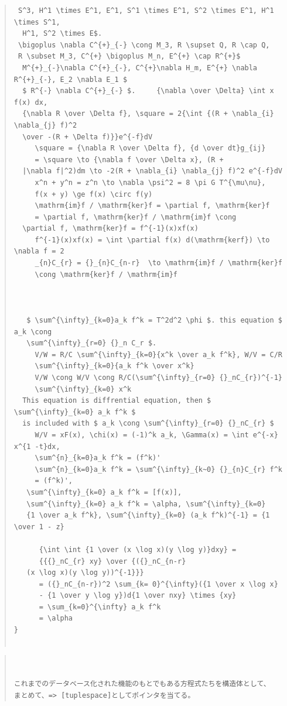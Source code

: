 \documentclass{jsarticle}
\begin{document}
\begin{quote}
\begin{verbatim}
 S^3, H^1 \times E^1, E^1, S^1 \times E^1, S^2 \times E^1, H^1 \times S^1, 
  H^1, S^2 \times E$.  
 \bigoplus \nabla C^{+}_{-} \cong M_3, R \supset Q, R \cap Q, 
 R \subset M_3, C^{+} \bigoplus M_n, E^{+} \cap R^{+}$
  M^{+}_{-}\nabla C^{+}_{-}, C^{+}\nabla H_m, E^{+} \nabla R^{+}_{-}, E_2 \nabla E_1 $
  $ R^{-} \nabla C^{+}_{-} $.     {\nabla \over \Delta} \int x f(x) dx,
  {\nabla R \over \Delta f}, \square = 2{\int {(R + \nabla_{i} \nabla_{j} f)^2
  \over -(R + \Delta f)}}e^{-f}dV   
     \square = {\nabla R \over \Delta f}, {d \over dt}g_{ij} 
     = \square \to {\nabla f \over \Delta x}, (R + 
  |\nabla f|^2)dm \to -2(R + \nabla_{i} \nabla_{j} f)^2 e^{-f}dV   
     x^n + y^n = z^n \to \nabla \psi^2 = 8 \pi G T^{\mu\nu}, 
     f(x + y) \ge f(x) \circ f(y)   
     \mathrm{im}f / \mathrm{ker}f = \partial f, \mathrm{ker}f 
     = \partial f, \mathrm{ker}f / \mathrm{im}f \cong
  \partial f, \mathrm{ker}f = f^{-1}(x)xf(x)   
     f^{-1}(x)xf(x) = \int \partial f(x) d(\mathrm{kerf}) \to \nabla f = 2   
     _{n}C_{r} = {}_{n}C_{n-r}  \to \mathrm{im}f / \mathrm{ker}f 
     \cong \mathrm{ker}f / \mathrm{im}f   

  

   $ \sum^{\infty}_{k=0}a_k f^k = T^2d^2 \phi $. this equation $ a_k \cong 
   \sum^{\infty}_{r=0} {}_n C_r $.
     V/W = R/C \sum^{\infty}_{k=0}{x^k \over a_k f^k}, W/V = C/R
     \sum^{\infty}_{k=0}{a_k f^k \over x^k}   
     V/W \cong W/V \cong R/C(\sum^{\infty}_{r=0} {}_nC_{r})^{-1} 
     \sum^{\infty}_{k=0} x^k   
  This equation is diffrential equation, then $ \sum^{\infty}_{k=0} a_k f^k $
  is included with $ a_k \cong \sum^{\infty}_{r=0} {}_nC_{r} $
     W/V = xF(x), \chi(x) = (-1)^k a_k, \Gamma(x) = \int e^{-x} x^{1 -t}dx, 
     \sum^{n}_{k=0}a_k f^k = (f^k)'   
     \sum^{n}_{k=0}a_k f^k = \sum^{\infty}_{k~0} {}_{n}C_{r} f^k   
     = (f^k)', 
   \sum^{\infty}_{k=0} a_k f^k = [f(x)], 
   \sum^{\infty}_{k=0} a_k f^k = \alpha, \sum^{\infty}_{k=0} 
   {1 \over a_k f^k}, \sum^{\infty}_{k=0} (a_k f^k)^{-1} = {1 \over 1 - z}   

      {\int \int {1 \over (x \log x)(y \log y)}dxy} = 
      {{{}_nC_{r} xy} \over {({}_nC_{n-r} 
   (x \log x)(y \log y))^{-1}}}   
      = ({}_nC_{n-r})^2 \sum_{k= 0}^{\infty}({1 \over x \log x}
      - {1 \over y \log y})d{1 \over nxy} \times {xy}   
      = \sum_{k=0}^{\infty} a_k f^k   
      = \alpha   
}


\end{verbatim}
\end{quote}

\begin{quote}
\setlength{\baselineskip}{12pt}
\begin{verbatim}


これまでのデータベース化された機能のもとでもある方程式たちを構造体として、
まとめて、=> [tuplespace]としてポインタを当てる。
\end{verbatim}
\end{quote}
\end{document}
